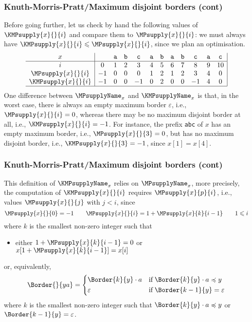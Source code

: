 %
\begin{frame}
\frametitle{Knuth-Morris-Pratt/Maximum disjoint borders (cont)}

Before going further, let us check by hand the following values of
\(\KMPsupply{x}{}{i}\) and compare them to \(\MPsupply{x}{}{i}\): we must
always have \(\KMPsupply{x}{}{i} \leqslant \MPsupply{x}{}{i}\), since we
plan an optimisation. 
\[
\begin{array}{c|ccccccccccc|}
x & & \texttt{a} & \texttt{b} & \texttt{c} & \texttt{a} 
  & \texttt{b} & \texttt{a} & \texttt{b} & \texttt{c}
  & \texttt{a} & \texttt{c}\\
\hline
                  i  &  0 & 1 & 2 &  3 & 4 & 5 & 6 & 7 &  8 & 9 & 10\\
   \MPsupply{x}{}{i} & -1 & 0 & 0 &  0 & 1 & 2 & 1 & 2 &  3 & 4 &  0\\
  \KMPsupply{x}{}{i} & -1 & 0 & 0 & -1 & 0 & 2 & 0 & 0 & -1 & 4 &  0\\
\hline
\end{array}
\]
One difference between \(\MPsupplyName_{x}\) and
\(\KMPsupplyName_{x}\) is that, in the worst case, there is always an
empty maximum border \(\varepsilon\), i.e., \(\MPsupply{x}{}{i} = 0\),
whereas there may be no maximum disjoint border at all,
i.e., \(\KMPsupply{x}{}{i} = -1\). For instance, the prefix
\texttt{abc} of \(x\) has an empty maximum border,
i.e., \(\MPsupply{x}{}{3}=0\), but has no maximum disjoint border,
i.e., \(\KMPsupply{x}{}{3} = -1\), since \(x[1] = x[4]\).

\end{frame}

%
\begin{frame}
\frametitle{Knuth-Morris-Pratt/Maximum disjoint borders (cont)}

This definition of \(\KMPsupplyName_{x}\) relies on
\(\MPsupplyName_{x}\), more precisely, the computation of
\(\KMPsupply{x}{}{i}\) requires \(\MPsupply{x}{p}{i}\), i.e.,
values \(\MPsupply{x}{}{j}\) with \(j < i\), since
\[
\MPsupply{x}{}{0} = -1 
\qquad \MPsupply{x}{}{i} = 1 + \MPsupply{x}{k}{i-1}
\qquad 1 \leqslant i
\]
where \(k\) is the smallest non-zero integer such that
\begin{itemize}

  \item either \(1 + \MPsupply{x}{k}{i-1} = 0\) or
    \(x[1+\MPsupply{x}{k}{i-1}] = x[i]\)

\end{itemize}
or, equivalently,
\[
\Border{}{ya} = 
\left\{
  \begin{aligned}
   & \Border{k}{y} \cdot a 
   && \text{if} \; \Border{k}{y} \cdot a \preccurlyeq y\\
   & \varepsilon 
   && \text{if} \; \Border{k-1}{y} = \varepsilon
  \end{aligned}
\right. 
\]
where \(k\) is the smallest non-zero integer such that \(\Border{k}{y}
\cdot a \preccurlyeq y\) or \(\Border{k-1}{y} = \varepsilon\).

\end{frame}

